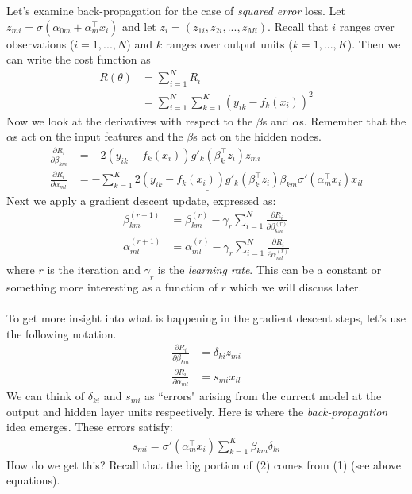 \documentclass[a4paper]{article}
\begin{document}
Let's examine back-propagation for the case of \emph{squared error} loss. Let ${z_{mi}=\sigma(\alpha_{0m}+\alpha^\top_{m}x_i)}$ and let $z_i=(z_{1i},z_{2i},...,z_{Mi})$. Recall that $i$ ranges over observations ($i=1,...,N$) and $k$ ranges over output units ($k=1,...,K$). Then we can write the cost function as
\begin{align*}
R(\theta)&=\sum_{i=1}^{N} R_i\\
&=\sum_{i=1}^N \sum_{k=1}^K (y_{ik}-f_k(x_i))^2
\end{align*}
Now we look at the derivatives with respect to the $\beta$s and $\alpha$s. Remember that the $\alpha$s act on the input features and the $\beta$s act on the hidden nodes.
\begin{align}
\frac{\partial R_i}{\partial \beta_{km}} &= -2(y_{ik}-f_k(x_i))g'_k(\beta^\top_kz_i)z_{mi}\\
\frac{\partial R_i}{\partial \alpha_{ml}} &= -\sum_{k=1}^K \underline{2(y_{ik}-f_k(x_i))g'_k(\beta^\top_kz_i)}\beta_{km}\sigma'(\alpha^\top_mx_i)x_{il}
 \end{align}
Next we apply a gradient descent update, expressed as:
\begin{align*}
\beta_{km}^{(r+1)} &= \beta_{km}^{(r)}-\gamma_r\sum_{i=1}^N \frac{\partial R_i}{\partial \beta_{km}^{(r)}}\\
\alpha_{ml}^{(r+1)} &= \alpha_{ml}^{(r)}-\gamma_r\sum_{i=1}^N \frac{\partial R_i}{\partial \alpha_{ml}^{(r)}}
\end{align*}
where $r$ is the iteration and $\gamma_r$ is the \emph{learning rate}. This can be a constant or something more interesting as a function of $r$ which we will discuss later.\\\\
To get more insight into what is happening in the gradient descent steps, let's use the following notation.
\begin{align*}
\frac{\partial R_i}{\partial \beta_{km}} &= \delta_{ki}z_{mi}\\
\frac{\partial R_i}{\partial \alpha_{ml}} &= s_{mi}x_{il}
\end{align*}
We can think of $\delta_{ki}$ and $s_{mi}$ as ``errors" arising from the current model at the output and hidden layer units respectively. Here is where the \emph{back-propagation} idea emerges. These errors satisfy:
\begin{align}
s_{mi}=\sigma'(\alpha_m^\top x_i)\sum_{k=1}^K \beta_{km}\delta_{ki}
\end{align}
How do we get this? Recall that the big portion of (2) comes from (1) (see above equations).
\end{document}
